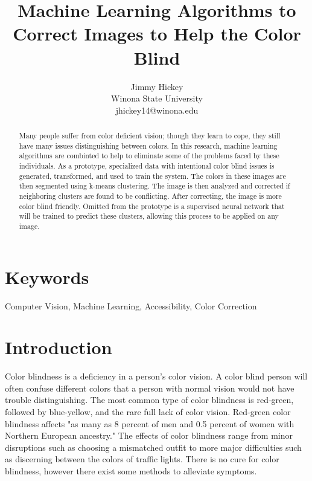 \documentclass[12pt]{article}
\title{
Machine Learning Algorithms to Correct Images to Help the Color Blind
}
\author{Jimmy Hickey\\ Winona State University \\ jhickey14@winona.edu}
\begin{document}
\maketitle

\begin{multicols}{2}


\begin{abstract}
Many people suffer from color deficient vision; though they learn to cope, they still have many issues distinguishing between colors. In this research, machine learning algorithms are combinted to help to eliminate some of the problems faced by these individuals. As a prototype, specialized data with intentional color blind issues is generated, transformed, and used to train the system. The colors in these images are then segmented using k-means clustering. The image is then analyzed and corrected if neighboring clusters are found to be conflicting. After correcting, the image is more color blind friendly. Omitted from the prototype is a supervised neural network that will be trained to predict these clusters, allowing this process to be applied on any image.

\end{abstract}

\section*{Keywords}
Computer Vision, Machine Learning, Accessibility, Color Correction

\section{Introduction}

Color blindness is a deficiency in a person's color vision. A color blind person will often confuse different colors that a person with normal vision would not have trouble distinguishing. The most common type of color blindness is red-green, followed by blue-yellow, and the rare full lack of color vision. Red-green color blindness affects "as many as 8 percent of men and 0.5 percent of women with Northern European ancestry." \cite{NEI} The effects of color blindness range from minor disruptions such as choosing a mismatched outfit to more major difficulties such as discerning between the colors of traffic lights.
There is no cure for color blindness, however there exist some methods to alleviate symptoms. 


\end{multicols}
\end{document}
